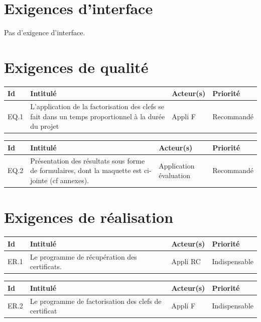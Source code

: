 \documentclass[a4paper,11pt,french]{article}
\begin{document}
\section{Exigences d'interface}
Pas d'exigence d'interface.

\section{Exigences de qualité}

\begin{center}
\begin{tabular}{|l|p{6cm}|p{6cm}|l|}
\hline
\textbf{Id} & \textbf{Intitulé} & \textbf{Acteur(s)} & \textbf{Priorité}\\
\hline
EQ.1 & L'application de la factorisation des clefs se fait dans un temps proportionnel à la durée du projet & Appli F & Recommandé \\
\hline
\end{tabular}
\end{center}

\begin{center}
\begin{tabular}{|l|p{6cm}|p{6cm}|l|}
\hline
\textbf{Id} & \textbf{Intitulé} & \textbf{Acteur(s)} & \textbf{Priorité}\\
\hline
EQ.2 & Présentation des résultats sous forme de formulaires, dont la maquette est ci-jointe (cf annexes). & Application évaluation & Recommandé \\
\hline
\end{tabular}
\end{center}

\section{Exigences de réalisation}

\begin{center}
\begin{tabular}{|l|p{6cm}|p{6cm}|l|}
\hline
\textbf{Id} & \textbf{Intitulé} & \textbf{Acteur(s)} & \textbf{Priorité}\\
\hline
ER.1 & Le programme de récupération des certificats. & Appli RC & Indispensable \\
\hline
\end{tabular}
\end{center}

\begin{center}
\begin{tabular}{|l|p{6cm}|p{6cm}|l|}
\hline
\textbf{Id} & \textbf{Intitulé} & \textbf{Acteur(s)} & \textbf{Priorité}\\
\hline
ER.2 & Le programme de factorisation des clefs de certificat & Appli F & Indispensable \\
\hline
\end{tabular}
\end{center}
\end{document}
